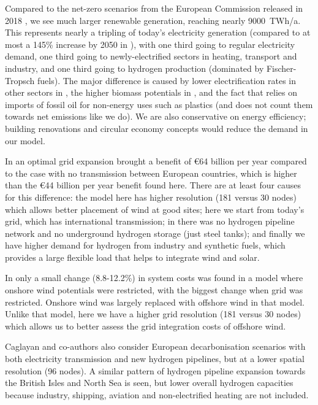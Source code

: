 Compared to the net-zero scenarios from the European Commission
released in 2018 \cite{in-depth_2018}, we see much larger renewable
generation, reaching nearly 9000~TWh/a. This represents nearly a
tripling of today's electricity generation (compared to at most a
145\% increase by 2050 in \cite{in-depth_2018}), with one third going
to regular electricity demand, one third going to newly-electrified
sectors in heating, transport and industry, and one third going to
hydrogen production (dominated by Fischer-Tropsch fuels). The major
difference is caused by lower electrification rates in other sectors
in \cite{in-depth_2018}, the higher biomass potentials
in \cite{in-depth_2018}, and the fact that \cite{in-depth_2018} relies
on imports of fossil oil for non-energy uses such as plastics (and
does not count them towards net emissions like we do). We are also
conservative on energy efficiency; building renovations and
circular economy concepts would reduce the demand in our model.

In \cite{brownSynergiesSector2018} an optimal grid expansion brought a benefit
of \euro64 billion per year compared to the case with no transmission
between European countries, which is higher than the \euro44 billion
per year benefit found here. There are at least four causes for this
difference: the model here has higher resolution (181 versus 30 nodes)
which allows better placement of wind at good sites; here we start
from today's grid, which has international transmission;
in \cite{brownSynergiesSector2018} there was no hydrogen pipeline network and no
underground hydrogen storage (just steel tanks); and finally we have
higher demand for hydrogen from industry and synthetic fuels, which
provides a large flexible load that helps to integrate wind and solar.

In \cite{schlachtbergerCostOptimal2018} only a small change
(8.8-12.2\%) in system costs was found in a model where onshore wind potentials
were restricted, with the biggest change when grid was
restricted. Onshore wind was largely replaced with offshore wind in
that model. Unlike that model, here we have a higher grid resolution
(181 versus 30 nodes) which allows us to better assess the grid
integration costs of offshore wind.

Caglayan and co-authors \cite{Caglayan2019} also consider European
decarbonisation scenarios with both electricity transmission and new
hydrogen pipelines, but at a lower spatial resolution (96 nodes). A
similar pattern of hydrogen pipeline expansion towards the British
Isles and North Sea is seen, but lower overall hydrogen capacities
because industry, shipping, aviation and non-electrified heating are
not included.

